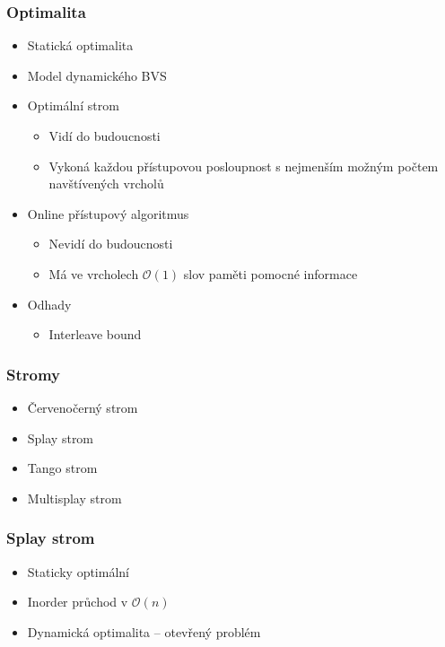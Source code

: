 \documentclass{beamer}
\begin{document}
\begin{frame}
\frametitle{Optimalita}
\begin{itemize}
\item Statická optimalita
\item Model dynamického BVS
\item Optimální strom
\begin{itemize}
\item Vidí do budoucnosti
\item Vykoná každou přístupovou posloupnost s nejmenším možným počtem navštívených vrcholů
\end{itemize}
\item Online přístupový algoritmus
\begin{itemize}
\item Nevidí do budoucnosti
\item Má ve vrcholech $\mathcal O(1)$ slov paměti pomocné informace
\end{itemize}
\item Odhady
\begin{itemize}
\item Interleave bound
\end{itemize}
\end{itemize}
\end{frame}

\begin{frame}
\frametitle{Stromy}
\begin{itemize}
\item Červenočerný strom
\item Splay strom
\item Tango strom
\item Multisplay strom
\end{itemize}
\end{frame}


\begin{frame}
\frametitle{Splay strom}
\begin{itemize}
\item Staticky optimální
\item Inorder průchod v $\mathcal O(n)$
\item Dynamická optimalita -- otevřený problém
\end{itemize}
\end{frame}
\end{document}
